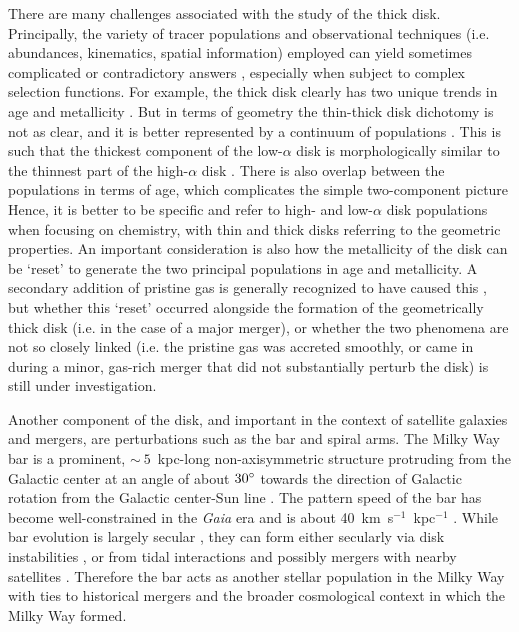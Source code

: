 There are many challenges associated with the study of the thick disk. Principally, the variety of tracer populations and observational techniques (i.e. abundances, kinematics, spatial information) employed can yield sometimes complicated or contradictory answers \parencite{minchev15,kawata16}, especially when subject to complex selection functions. For example, the thick disk clearly has two unique trends in age and metallicity \parencite{haywood13,hayden15}. But in terms of geometry the thin-thick disk dichotomy is not as clear, and it is better represented by a continuum of populations \parencite{bovy12e,bovy16b}. This is such that the thickest component of the low-$\alpha$ disk is morphologically similar to the thinnest part of the high-$\alpha$ disk \parencite{hayden17}. There is also overlap between the populations in terms of age, which complicates the simple two-component picture \parencite{mackereth17,hayden17} Hence, it is better to be specific and refer to high- and low-$\alpha$ disk populations when focusing on chemistry, with thin and thick disks referring to the geometric properties. An important consideration is also how the metallicity of the disk can be `reset' to generate the two principal populations in age and metallicity. A secondary addition of pristine gas is generally recognized to have caused this \parencite[see][]{chiappini97}, but whether this `reset' occurred alongside the formation of the geometrically thick disk (i.e. in the case of a major merger), or whether the two phenomena are not so closely linked (i.e. the pristine gas was accreted smoothly, or came in during a minor, gas-rich merger that did not substantially perturb the disk) is still under investigation.

Another component of the disk, and important in the context of satellite galaxies and mergers, are perturbations such as the bar and spiral arms. The Milky Way bar is a prominent, $\sim~5$~kpc-long non-axisymmetric structure protruding from the Galactic center at an angle of about $30\hbox{$^\circ$}$ towards the direction of Galactic rotation from the Galactic center-Sun line \parencite{wegg15}. The pattern speed of the bar has become well-constrained in the \textit{Gaia} era and is about 40~km~s$^{-1}$~kpc$^{-1}$ \parencite[e.g.][]{bovy19,sanders19}. While bar evolution is largely secular \parencite{athanassoula03}, they can form either secularly via disk instabilities \parencite{ostriker73}, or from tidal interactions and possibly mergers with nearby satellites \parencite{noguchi87,gerin90}. Therefore the bar acts as another stellar population in the Milky Way with ties to historical mergers and the broader cosmological context in which the Milky Way formed.

